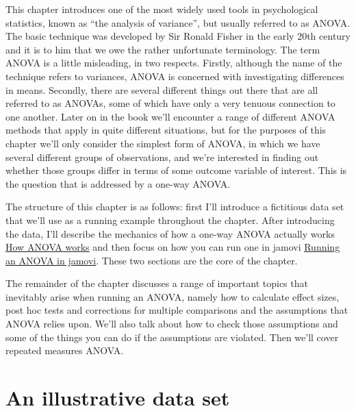 \documentclass[
  a4paper,
]{book}
\begin{document}
This chapter introduces one of the most widely used tools in
psychological statistics, known as ``the analysis of variance'', but
usually referred to as ANOVA. The basic technique was developed by Sir
Ronald Fisher in the early 20th century and it is to him that we owe the
rather unfortunate terminology. The term ANOVA is a little misleading,
in two respects. Firstly, although the name of the technique refers to
variances, ANOVA is concerned with investigating differences in means.
Secondly, there are several different things out there that are all
referred to as ANOVAs, some of which have only a very tenuous connection
to one another. Later on in the book we'll encounter a range of
different ANOVA methods that apply in quite different situations, but
for the purposes of this chapter we'll only consider the simplest form
of ANOVA, in which we have several different groups of observations, and
we're interested in finding out whether those groups differ in terms of
some outcome variable of interest. This is the question that is
addressed by a one-way ANOVA.

The structure of this chapter is as follows: first I'll introduce a
fictitious data set that we'll use as a running example throughout the
chapter. After introducing the data, I'll describe the mechanics of how
a one-way ANOVA actually works
\protect\hyperlink{sec-How-ANOVA-works}{How ANOVA works} and then focus
on how you can run one in jamovi
\protect\hyperlink{running-an-anova-in-jamovi}{Running an ANOVA in
jamovi}. These two sections are the core of the chapter.

The remainder of the chapter discusses a range of important topics that
inevitably arise when running an ANOVA, namely how to calculate effect
sizes, post hoc tests and corrections for multiple comparisons and the
assumptions that ANOVA relies upon. We'll also talk about how to check
those assumptions and some of the things you can do if the assumptions
are violated. Then we'll cover repeated measures ANOVA.

\hypertarget{an-illustrative-data-set}{%
\section{An illustrative data set}\label{an-illustrative-data-set}}
\end{document}
